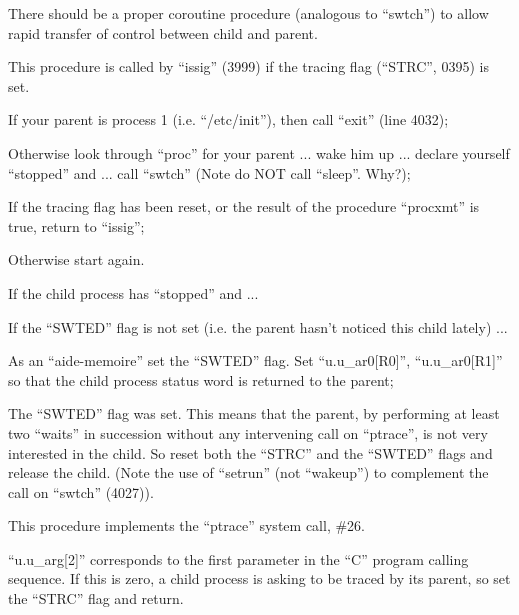 \item There should be a proper coroutine
 procedure (analogous to ``swtch'')
 to allow rapid transfer of control between child and parent.
\ei


This procedure is called by ``issig''
(3999) if the tracing flag (``STRC'',
0395) is set.

\bd
\item[4022:] If your parent is process 1
 (i.e. ``/etc/init''), then call
 ``exit'' (line 4032);

\item[4023:] Otherwise look through ``proc'' for
 your parent ... wake him up ...
 declare yourself ``stopped'' and
 ... call ``swtch'' (Note do NOT
 call ``sleep''. Why?);

\item[4028:] If the tracing flag has been
 reset, or the result of the procedure ``procxmt'' is true, return
 to ``issig'';

\item[4029:] Otherwise start again.
\ed


\bd
\item[3301:] If the child process has
 ``stopped'' and ...

\item[3302:] If the ``SWTED'' flag is not set
 (i.e. the parent hasn't noticed
 this child lately) ...

\item[3303:] As an ``aide-memoire'' set the
 ``SWTED'' flag. Set ``u.u\_ar0[R0]'',
 ``u.u\_ar0[R1]'' so that the child
 process status word is returned
 to the parent;

\item[3309:] The ``SWTED'' flag was set. This
 means that the parent, by performing at least two ``waits'' in
 succession without any intervening call on ``ptrace'', is not very
 interested in the child. So
 reset both the ``STRC'' and the
 ``SWTED'' flags and release the
 child. (Note the use of ``setrun''
 (not ``wakeup'') to complement the
 call on ``swtch'' (4027)).
\ed


This procedure implements the ``ptrace''
system call, \#26.

\bd
\item[4168:] ``u.u\_arg[2]'' corresponds to the
 first parameter in the ``C'' program calling sequence. If this is
 zero, a child process is asking
 to be traced by its parent, so
 set the ``STRC'' flag and return.
\ed

